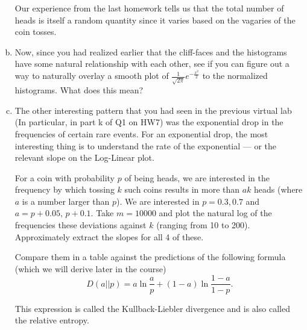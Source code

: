 \documentclass[]{article}
\newif\ifsolutions
\renewcommand{\answer}[1]{{\color{mydarkblue}\textbf{Solution:}#1}}
\begin{document}
\begin{qunlist}
\begin{enumerate}[a)]
 Our experience from the last homework tells us that the total number
 of heads is itself a random quantity since it varies based on the
 vagaries of the coin tosses.

\ifsolutions{ \answer { We can write $S$ as
\[ S = \sum_{i=1}^k X_i. \]
}}\fi

\qpart 
\item Now, since you had realized earlier that the cliff-faces and the
  histograms have some natural relationship with each other, see if
  you can figure out a way to naturally overlay a smooth plot of
  $\frac{1}{\sqrt{2\pi}} e^{-\frac{x^2}{2}}$ to the normalized
  histograms. What does this mean?

\ifsolutions{ \answer { By normalizing the histograms so that the sum of the heights of all the columns equals 1, we can overlay the function above very nicely. This suggests that integrating these histograms will yield the cliff-face shapes plotted above. It also suggests that the probability of getting certain numbers of heads is related to the normal distribution.
\begin{figure}[h!]
\center
\texttt{[image: figs/part\_c.png]}
\end{figure}
}}\fi

\qpart
\item The other interesting pattern that you had seen in the previous
  virtual lab (In particular, in part k of Q1 on HW7) was the
  exponential drop in the frequencies of certain rare events. For an
  exponential drop, the most interesting thing is to understand the
  rate of the exponential --- or the relevant slope on the Log-Linear
  plot.  

  For a coin with probability $p$ of being heads, we are interested in
  the frequency by which tossing $k$ such coins results in more than
  $ak$ heads (where $a$ is a number larger than $p$). We are
  interested in $p=0.3,0.7$ and $a = p+0.05$,
  $p+0.1$.  Take $m = 10000$ and plot the natural log of the frequencies 
  these deviations against $k$ (ranging from 10 to 200). Approximately
  extract the slopes for all 4 of these.

  Compare them in a table against the predictions of the following
  formula (which we will derive later in the course)
  $$D(a||p) = a \ln \frac{a}{p} + (1-a) \ln \frac{1-a}{1-p}.$$
  
  This expression is called the Kullback-Liebler divergence and is also
  called the relative entropy. 


\end{enumerate}
\end{qunlist}
\end{document}
